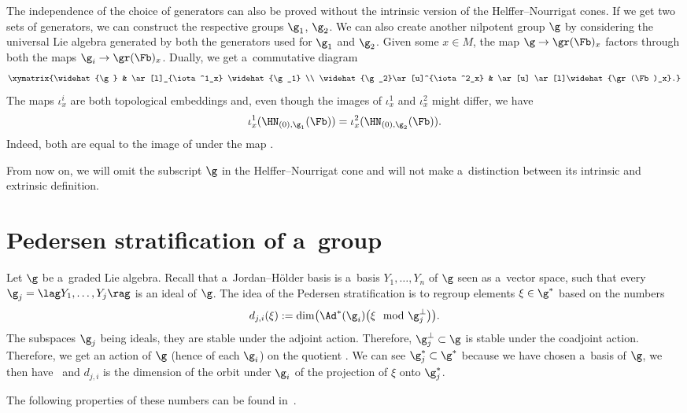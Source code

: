 \begin{rem}
 The independence of the choice of generators can also be proved without the intrinsic version of the Helffer--Nourrigat cones. If we get two sets of generators, we can construct the respective groups $\g_1$, $\g_2$. We can also create another nilpotent group $\g$ by considering the universal Lie algebra generated by both the generators used for $\g_1$ and $\g_2$. Given some $x \in M$, the map $\g \to \gr(\Fb)_x$ factors through both the maps $\g_i \to \gr(\Fb)_x$. Dually, we get a~commutative diagram
 \[\xymatrix{\widehat{\g} & \ar[l]_{\iota^1_x} \widehat{\g_1} \\
 \widehat{\g_2}\ar[u]^{\iota^2_x} & \ar[u] \ar[l]\widehat{\gr(\Fb)_x}.}\]
 The maps $\iota^i_x$ are both topological embeddings and, even though the images of $\iota_x^1$ and $\iota_x^2$ might differ, we have
 \[\iota_x^1(\HN_{(0),\g_1}(\Fb)) = \iota_x^2(\HN_{(0),\g_2}(\Fb)).\]
 Indeed, both are equal to the image of  under the map .
\end{rem}

From now on, we will omit the subscript $\g$ in the Helffer--Nourrigat cone and will not make a~distinction between its intrinsic and extrinsic definition.

\section{Pedersen stratification of a~group}\label{Section:PedersenStratification}

Let $\g$ be a~graded Lie algebra. Recall that a~Jordan--H\"older basis is a~basis $Y_1, \dots, Y_n$ of $\g$ seen as a~vector space, such that every $\g_j = \lag Y_1,\dots,Y_j\rag$ is an ideal of $\g$. The idea of the Pedersen stratification is to regroup elements $\xi \in \g^*$ based on the numbers
\[d_{j,i}(\xi) := \dim\bigl(\Ad^*(\g_i) \bigl(\xi \mod \g_j^{\perp} \bigr)\bigr).
\]
The subspaces $\g_j$ being ideals, they are stable under the adjoint action. Therefore, $\g_j^{\perp}\subset\g$ is stable under the coadjoint action. Therefore, we get an action of $\g$ (hence of each $\g_i$) on the quotient . We can see $\g_j^*\subset \g^*$ because we have chosen a~basis of $\g$, we then have~ and $d_{j,i}$ is the dimension of the orbit under $\g_i$ of the projection of $\xi$ onto $\g_j^*$.

The following properties of these numbers can be found in~\cite{Bonnet,PedersenStratification}.

